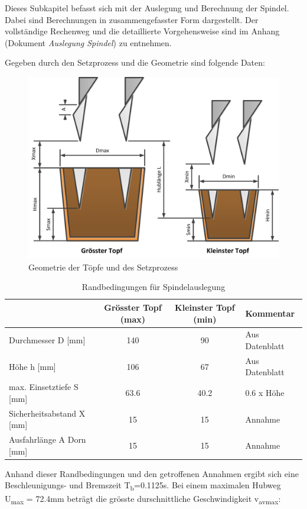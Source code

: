 Dieses Subkapitel befasst sich mit der Auslegung und Berechnung der Spindel. Dabei sind Berechnungen in zusammengefasster Form dargestellt. Der vollständige Rechenweg und die detaillierte Vorgehensweise sind im Anhang (Dokument \textit{Auslegung Spindel}) zu entnehmen.

Gegeben durch den Setzprozess und die Geometrie sind folgende Daten:
	\begin{figure}[H]
	\includegraphics[width=1\textwidth]{Illustrationen/6-Umsetzung/topfgeometrie.png}
	\caption{Geometrie der Töpfe und des Setzprozess}
	\label{fig:topfgeometrie}
	\end{figure}
\begin{table}[H]
\begin{tabular}{|l|c|c|l|}
	\hline 
	& Grösster Topf (max) & Kleinster Topf (min) & Kommentar \\ 
	\hline 
	Durchmesser D [mm] & 140 & 90 & Aus Datenblatt \\ 
	\hline 
	Höhe h [mm] & 106 & 67 & Aus Datenblatt \\ 
	\hline 
	max. Einsetztiefe S [mm] & 63.6 & 40.2 & 0.6 x Höhe \\ 
	\hline 
	Sicherheitsabstand X [mm] & 15 & 15 & Annahme \\ 
	\hline 
	Ausfahrlänge A Dorn [mm] & 15 & 15 & Annahme \\ 
	\hline 
\end{tabular} 
	\caption{Randbedingungen für Spindelauslegung}
	\label{tab:Randbedingungen}
\end{table}

Anhand dieser Randbedingungen und den getroffenen Annahmen ergibt sich eine Beschleunigungs- und Bremszeit T\textsubscript{b}=0.1125s. Bei einem maximalen Hubweg U\textsubscript{max} = 72.4mm beträgt die grösste durschnittliche Geschwindigkeit v\textsubscript{avmax}:

